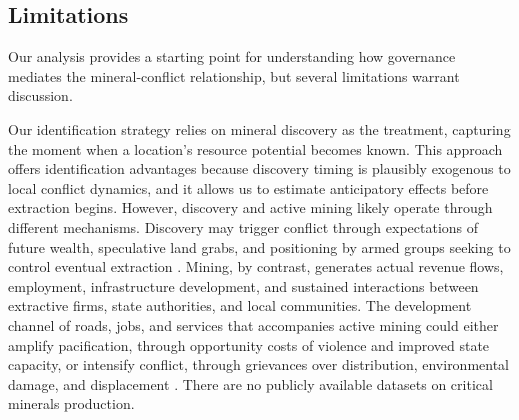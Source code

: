 \documentclass[11pt]{article}
\begin{document}


\subsection{Limitations}

Our analysis provides a starting point for understanding how governance mediates the mineral-conflict relationship, but several limitations warrant discussion.

Our identification strategy relies on mineral discovery as the treatment, capturing the moment when a location's resource potential becomes known. This approach offers identification advantages because discovery timing is plausibly exogenous to local conflict dynamics, and it allows us to estimate anticipatory effects before extraction begins. However, discovery and active mining likely operate through different mechanisms. Discovery may trigger conflict through expectations of future wealth, speculative land grabs, and positioning by armed groups seeking to control eventual extraction \citep{cust2015dutch, lei2019natural}. Mining, by contrast, generates actual revenue flows, employment, infrastructure development, and sustained interactions between extractive firms, state authorities, and local communities. The development channel of roads, jobs, and services that accompanies active mining could either amplify pacification, through opportunity costs of violence and improved state capacity, or intensify conflict, through grievances over distribution, environmental damage, and displacement \citep{aragon2015mining, kotsadam2018industrial}. There are no publicly available datasets on critical minerals production.
\end{document}
